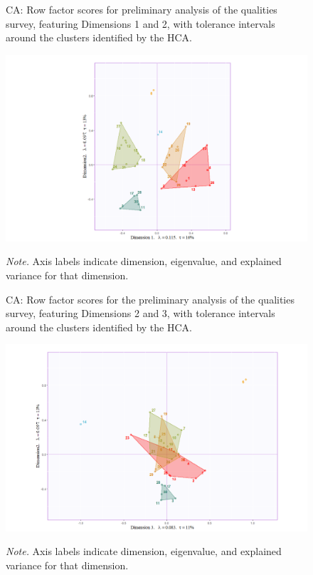 \documentclass[
]{article}
\begin{document}
\begin{figure}[H]   
  \centering  
  \caption{CA: Row factor scores for preliminary analysis of the qualities survey, featuring Dimensions 1 and 2, with tolerance intervals around the clusters identified by the HCA.}
    \includegraphics{./supmatsimgs/qfactormap12.png}
  \label{fig:qimap12}
  \caption*{\footnotesize \textit{Note.} Axis labels indicate dimension, eigenvalue, and explained variance for that dimension.}
\end{figure}

\begin{figure}[H]   
  \centering  
  \caption{CA: Row factor scores for the preliminary analysis of the qualities survey, featuring Dimensions 2 and 3, with tolerance intervals around the clusters identified by the HCA.}
    \includegraphics{./supmatsimgs/qfactormap23.png}
  \label{fig:qimap23}
  \caption*{\footnotesize \textit{Note.} Axis labels indicate dimension, eigenvalue, and explained variance for that dimension.}
\end{figure}
\end{document}
